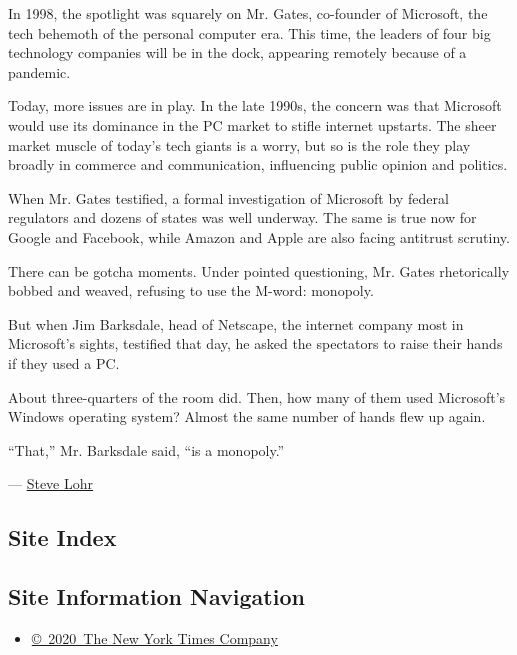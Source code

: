 In 1998, the spotlight was squarely on Mr. Gates, co-founder of
Microsoft, the tech behemoth of the personal computer era. This time,
the leaders of four big technology companies will be in the dock,
appearing remotely because of a pandemic.

Today, more issues are in play. In the late 1990s, the concern was that
Microsoft would use its dominance in the PC market to stifle internet
upstarts. The sheer market muscle of today's tech giants is a worry, but
so is the role they play broadly in commerce and communication,
influencing public opinion and politics.

When Mr. Gates testified, a formal investigation of Microsoft by federal
regulators and dozens of states was well underway. The same is true now
for Google and Facebook, while Amazon and Apple are also facing
antitrust scrutiny.

There can be gotcha moments. Under pointed questioning, Mr. Gates
rhetorically bobbed and weaved, refusing to use the M-word: monopoly.

But when Jim Barksdale, head of Netscape, the internet company most in
Microsoft's sights, testified that day, he asked the spectators to raise
their hands if they used a PC.

About three-quarters of the room did. Then, how many of them used
Microsoft's Windows operating system? Almost the same number of hands
flew up again.

``That,'' Mr. Barksdale said, ``is a monopoly.''

--- \href{https://www.nytimes3xbfgragh.onion/by/steve-lohr}{Steve Lohr}

\hypertarget{site-index}{%
\subsection{Site Index}\label{site-index}}

\hypertarget{site-information-navigation}{%
\subsection{Site Information
Navigation}\label{site-information-navigation}}

\begin{itemize}
\tightlist
\item
  \href{https://help.nytimes3xbfgragh.onion/hc/en-us/articles/115014792127-Copyright-notice}{©~2020~The
  New York Times Company}
\end{itemize}

